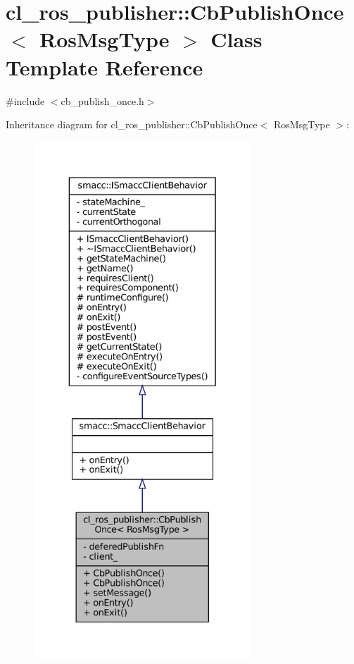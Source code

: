 \hypertarget{classcl__ros__publisher_1_1CbPublishOnce}{}\section{cl\+\_\+ros\+\_\+publisher\+:\+:Cb\+Publish\+Once$<$ Ros\+Msg\+Type $>$ Class Template Reference}
\label{classcl__ros__publisher_1_1CbPublishOnce}


{\ttfamily \#include $<$cb\+\_\+publish\+\_\+once.\+h$>$}



Inheritance diagram for cl\+\_\+ros\+\_\+publisher\+:\+:Cb\+Publish\+Once$<$ Ros\+Msg\+Type $>$\+:
\nopagebreak
\begin{figure}[H]
\begin{center}
\leavevmode
\includegraphics[height=550pt]{classcl__ros__publisher_1_1CbPublishOnce__inherit__graph}
\end{center}
\end{figure}



